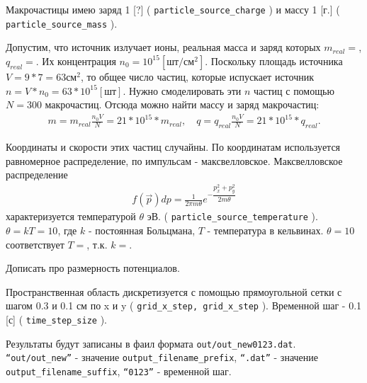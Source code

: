 Макрочастицы имею заряд 1 [?] ( \texttt{particle\_source\_charge} ) и массу 1 [г.] ( \texttt{particle\_source\_mass} ).

Допустим, что источник излучает ионы, реальная масса и заряд которых $m_{real} = $, $q_{real} = $.
Их концентрация $ n_0 = 10^{15} [\mbox{шт} / \mbox{см}^2]$.
Поскольку площадь источника $ V = 9 * 7 = 63 \mbox{см}^2 $, то общее число частиц, которые 
испускает источник $n = V * n_0 = 63 * 10^{15} [\mbox{шт}]$.
Нужно смоделировать эти $n$ частиц с помощью $N = 300$ макрочастиц.
Отсюда можно найти массу и заряд макрочастиц:
\begin{gather}
  m = m_{real} \frac{ n_0 V }{ N } = 21 * 10^{15} * m_{real},
  \quad
  q = q_{real} \frac{ n_0 V }{ N } = 21 * 10^{15} * q_{real}.
\end{gather}

Координаты и скорости этих частиц случайны. 
По координатам используется равномерное распределение, по импульсам - максвелловское.
Максвелловское распределение 
\begin{gather}
  f( \vec{p} ) dp = \frac{1}{ 2 \pi m \theta } e^{ - \dfrac{ p_x^2 + p_y^2 }{ 2 m \theta } }
\end{gather}
характеризуется температурой $\theta$ эВ. ( \texttt{particle\_source\_temperature} ).
$\theta = k T = 10$, где $k$ - постоянная Больцмана, $T$ - температура в кельвинах. 
$\theta = 10$ соответствует $T = $, т.к. $k = $.

Дописать про размерность потенциалов.

Пространственная область дискретизуется с помощью прямоугольной сетки с шагом
0.3 и 0.1 см по x и y ( \texttt{grid\_x\_step, grid\_x\_step} ).
Временной шаг - 0.1 [с] ( \texttt{time\_step\_size} ).

Результаты будут записаны в фаил формата \texttt{out/out\_new0123.dat}.
\texttt{``out/out\_new''} - значение \texttt{output\_filename\_prefix},
\texttt{``.dat''} - значение \texttt{output\_filename\_suffix},
\texttt{``0123''} - временной шаг.

